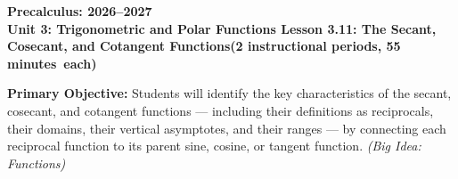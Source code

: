 \documentclass[10pt]{article}
\newcommand{\CourseName}{Precalculus}
\newcommand{\SchoolYear}{2026--2027}
\newcommand{\MeetingLength}{55 minutes}
\newcommand{\UnitNumberName}{Unit 3: Trigonometric and Polar Functions \quad}
\newcommand{\LessonNumberName}{Lesson 3.11: The Secant, Cosecant, and Cotangent Functions}
\begin{document}
\begin{center}
  {\Large\bfseries \CourseName: \SchoolYear} \\[4pt]
  {\small\bfseries \UnitNumberName \LessonNumberName \quad (2 instructional periods, \MeetingLength\ each)}
\end{center}

\begin{tcolorbox}[colback=sky, colframe=navy, boxrule=0.9pt, arc=2mm,
    left=2mm, right=2mm, top=1.5mm, bottom=1.5mm]
  \textbf{Primary Objective:} Students will identify the key characteristics
  of the secant, cosecant, and cotangent functions --- including their definitions
  as reciprocals, their domains, their vertical asymptotes, and their ranges ---
  by connecting each reciprocal function to its parent sine, cosine, or tangent
  function.
  \textit{(Big Idea: Functions)}
\end{tcolorbox}

\vspace{0.08in}
\end{document}
